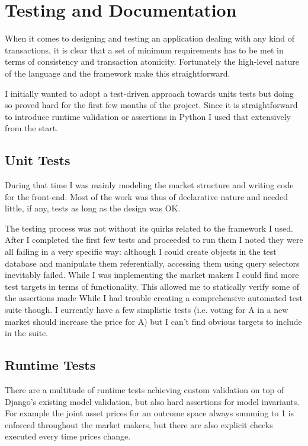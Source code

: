 \documentclass[bsc,frontabs,twoside,singlespacing,parskip,deptreport]{infthesis}     %
\begin{document}
\section{Testing and Documentation}
	When it comes to designing and testing an application dealing with any kind of transactions, it is clear that a set of minimum requirements has to be met in terms of consistency and transaction atomicity. Fortunately the high-level nature of the language and the framework make this straightforward. 

	I initially wanted to adopt a test-driven approach towards units tests but doing so proved hard for the first few months of the project. Since it is straightforward to introduce runtime validation or assertions in Python I used that extensively from the start. 
\subsection{Unit Tests}
	During that time I was mainly modeling the market structure and writing code for the front-end. Most of the work was thus of declarative nature and needed little, if any, tests as long as the design was OK. 

	The testing process was not without its quirks related to the framework I used. After I completed the first few tests and proceeded to run them I noted they were all failing in a very specific way: although I could create objects in the test database and manipulate them referentially, accessing them using query selectors inevitably failed. 
	While I was implementing the market makers I could find more test targets in terms of functionality. This allowed me to statically verify some of the assertions made 
While I had trouble creating a comprehensive automated test suite though. I currently have a few simplistic tests (i.e. voting for A in a new market should increase the price for A) but I can’t find obvious targets to include in the suite.
\subsection{Runtime Tests}
    There are a multitude of runtime tests achieving custom validation on top of Django’s existing model validation, but also hard assertions for model invariants. For example the joint asset prices for an outcome space always summing to 1 is enforced throughout the market makers, but there are also explicit checks executed every time prices change.
\end{document}
